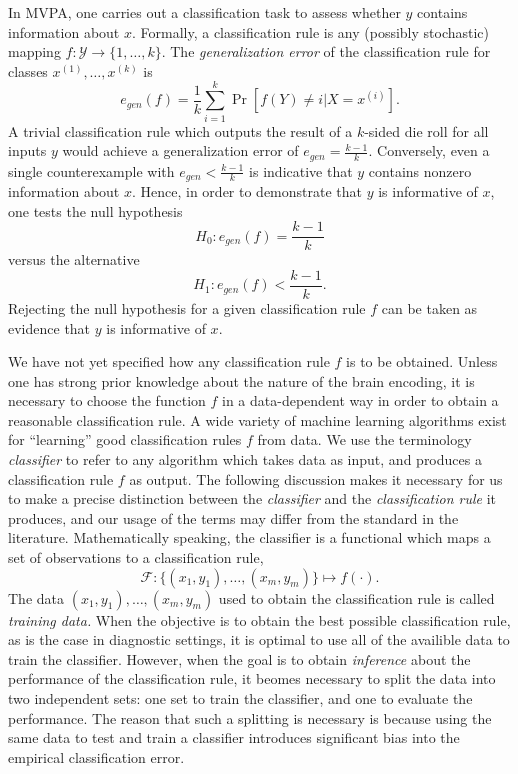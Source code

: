 \documentclass[12pt]{article}
\begin{document}
In MVPA, one carries out a classification task to assess whether $y$
contains information about $x$.  Formally, a classification rule is
any (possibly stochastic) mapping $f: \mathcal{Y} \to \{1,\hdots,
k\}$.  The \emph{generalization error} of the classification rule for classes $x^{(1)},\hdots, x^{(k)}$ is
\[
e_{gen}(f) = \frac{1}{k} \sum_{i=1}^k\Pr[f(Y) \neq i | X = x^{(i)}].
\]
A trivial classification rule which outputs the result of a $k$-sided
die roll for all inputs $y$ would achieve a generalization error of
$e_{gen} = \frac{k-1}{k}$.  Conversely, even a single counterexample
with $e_{gen} < \frac{k-1}{k}$ is indicative that $y$ contains nonzero
information about $x$.  Hence, in order to demonstrate that $y$ is
informative of $x$, one tests the null hypothesis
\[
H_0: e_{gen}(f) = \frac{k-1}{k}
\]
versus the alternative
\[
H_1: e_{gen}(f) < \frac{k-1}{k}.
\]
Rejecting the null hypothesis for a given classification rule $f$ can
be taken as evidence that $y$ is informative of $x$.

We have not yet specified how any classification rule $f$ is to be
obtained.  Unless one has strong prior knowledge about the nature of
the brain encoding, it is necessary to choose the function $f$ in a
data-dependent way in order to obtain a reasonable classification
rule.  A wide variety of machine learning algorithms exist for
``learning'' good classification rules $f$ from data.  We use the
terminology \emph{classifier} to refer to any algorithm which takes
data as input, and produces a classification rule $f$ as output.  The
following discussion makes it necessary for us to make a precise
distinction between the \emph{classifier} and the \emph{classification
rule} it produces, and our usage of the terms may differ from the
standard in the literature.  Mathematically speaking, the classifier
is a functional which maps a set of observations to a classification
rule,
\[
\mathcal{F}: \{(x_1,y_1),\hdots, (x_m, y_m)\} \mapsto f(\cdot).
\]
The data $(x_1,y_1),\hdots, (x_m, y_m)$ used to obtain the
classification rule is called \emph{training data.}  When the
objective is to obtain the best possible classification rule, as is
the case in diagnostic settings, it is optimal to use all of the
availible data to train the classifier.  However, when the goal is to
obtain \emph{inference} about the performance of the classification
rule, it beomes necessary to split the data into two independent sets:
one set to train the classifier, and one to evaluate the performance.
The reason that such a splitting is necessary is because using the
same data to test and train a classifier introduces significant bias
into the empirical classification error.
\end{document}
